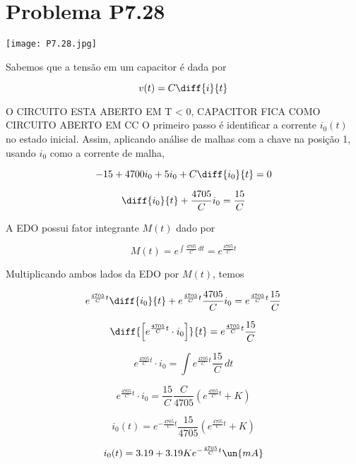 
\section*{Problema P7.28}

\renewcommand*\thesection{7.28}

\begin{center}
    \texttt{[image: P7.28.jpg]}
\end{center}

Sabemos que a tensão em um capacitor é dada por	

\begin{equation}\label{eq:7.28.1}
    v(t) = C\diff{i}{t}
\end{equation}


O CIRCUITO ESTA ABERTO EM T < 0, CAPACITOR FICA COMO CIRCUITO ABERTO EM CC
O primeiro passo é identificar a corrente $i_0(t)$ no estado inicial. Assim, aplicando análise de malhas com a chave na posição 1, usando $i_0$ como a corrente de malha,

\[ -15 + 4700i_0 + 5i_0 + C\diff{i_0}{t} = 0 \]

\[ \diff{i_0}{t} + \frac{4705}{C}i_0 = \frac{15}{C}\]

A EDO possui fator integrante $M(t)$ dado por 

\[ M(t) = e^{\int \frac{4705}{C} \, dt}  = e^{\frac{4705}{C}t} \]

Multiplicando ambos lados da EDO por $M(t)$, temos

\[ e^{\frac{4705}{C}t}\diff{i_0}{t} + e^{\frac{4705}{C}t}\frac{4705}{C}i_0 = e^{\frac{4705}{C}t} \frac{15}{C}\]

\[ \diff{\left[e^{\frac{4705}{C}t} \cdot i_0\right]}{t} = e^{\frac{4705}{C}t} \frac{15}{C}\]

\[ e^{\frac{4705}{C}t} \cdot i_0 = \int e^{\frac{4705}{C}t} \frac{15}{C} \, dt \]

\[ e^{\frac{4705}{C}t} \cdot i_0 = \frac{15}{C} \frac{C}{4705} \left(e^{\frac{4705}{C}t} + K\right) \]

\[ i_0(t) = e^{-\frac{4705}{C}t} \frac{15}{4705}\left(e^{\frac{4705}{C}t} + K\right) \]

\[ i_0(t) = 3.19 + 3.19Ke^{-\frac{4705}{C}t} \un{mA} \]










